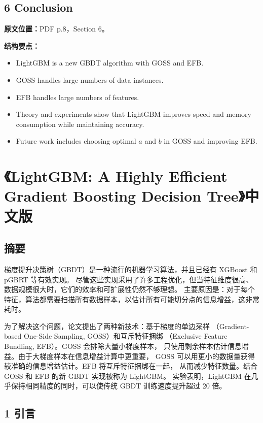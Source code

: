 \section{6 Conclusion}

\textbf{原文位置：}PDF p.8，Section 6。

\textbf{结构要点：}
\begin{itemize}
  \item LightGBM is a new GBDT algorithm with GOSS and EFB.
  \item GOSS handles large numbers of data instances.
  \item EFB handles large numbers of features.
  \item Theory and experiments show that LightGBM improves speed and memory consumption while maintaining accuracy.
  \item Future work includes choosing optimal $a$ and $b$ in GOSS and improving EFB.
\end{itemize}

\chapter{《LightGBM: A Highly Efficient Gradient Boosting Decision Tree》中文版}

\section{摘要}

梯度提升决策树（GBDT）是一种流行的机器学习算法，并且已经有 XGBoost 和 pGBRT 等有效实现。
尽管这些实现采用了许多工程优化，但当特征维度很高、数据规模很大时，它们的效率和可扩展性仍然不够理想。
主要原因是：对于每个特征，算法都需要扫描所有数据样本，以估计所有可能切分点的信息增益，这非常耗时。

为了解决这个问题，论文提出了两种新技术：基于梯度的单边采样
（Gradient-based One-Side Sampling, GOSS）和互斥特征捆绑
（Exclusive Feature Bundling, EFB）。GOSS 会排除大量小梯度样本，
只使用剩余样本估计信息增益。由于大梯度样本在信息增益计算中更重要，
GOSS 可以用更小的数据量获得较准确的信息增益估计。EFB 将互斥特征捆绑在一起，
从而减少特征数量。结合 GOSS 和 EFB 的新 GBDT 实现被称为 LightGBM。
实验表明，LightGBM 在几乎保持相同精度的同时，可以使传统 GBDT 训练速度提升超过 20 倍。

\section{1 引言}

